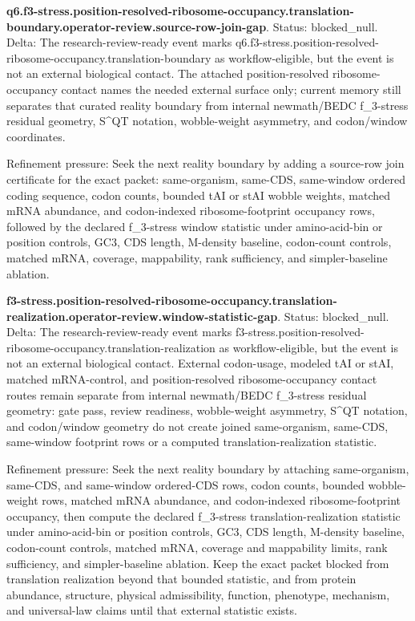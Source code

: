 \textbf{q6.f3-stress.position-resolved-ribosome-occupancy.translation-boundary.operator-review.source-row-join-gap}. Status: blocked\_null. Delta: The research-review-ready event marks q6.f3-stress.position-resolved-ribosome-occupancy.translation-boundary as workflow-eligible, but the event is not an external biological contact. The attached position-resolved ribosome-occupancy contact names the needed external surface only; current memory still separates that curated reality boundary from internal newmath/BEDC f\_3-stress residual geometry, S\textasciicircum{}QT notation, wobble-weight asymmetry, and codon/window coordinates.

Refinement pressure: Seek the next reality boundary by adding a source-row join certificate for the exact packet: same-organism, same-CDS, same-window ordered coding sequence, codon counts, bounded tAI or stAI wobble weights, matched mRNA abundance, and codon-indexed ribosome-footprint occupancy rows, followed by the declared f\_3-stress window statistic under amino-acid-bin or position controls, GC3, CDS length, M-density baseline, codon-count controls, matched mRNA, coverage, mappability, rank sufficiency, and simpler-baseline ablation.

\textbf{f3-stress.position-resolved-ribosome-occupancy.translation-realization.operator-review.window-statistic-gap}. Status: blocked\_null. Delta: The research-review-ready event marks f3-stress.position-resolved-ribosome-occupancy.translation-realization as workflow-eligible, but the event is not an external biological contact. External codon-usage, modeled tAI or stAI, matched mRNA-control, and position-resolved ribosome-occupancy contact routes remain separate from internal newmath/BEDC f\_3-stress residual geometry: gate pass, review readiness, wobble-weight asymmetry, S\textasciicircum{}QT notation, and codon/window geometry do not create joined same-organism, same-CDS, same-window footprint rows or a computed translation-realization statistic.

Refinement pressure: Seek the next reality boundary by attaching same-organism, same-CDS, and same-window ordered-CDS rows, codon counts, bounded wobble-weight rows, matched mRNA abundance, and codon-indexed ribosome-footprint occupancy, then compute the declared f\_3-stress translation-realization statistic under amino-acid-bin or position controls, GC3, CDS length, M-density baseline, codon-count controls, matched mRNA, coverage and mappability limits, rank sufficiency, and simpler-baseline ablation. Keep the exact packet blocked from translation realization beyond that bounded statistic, and from protein abundance, structure, physical admissibility, function, phenotype, mechanism, and universal-law claims until that external statistic exists.

